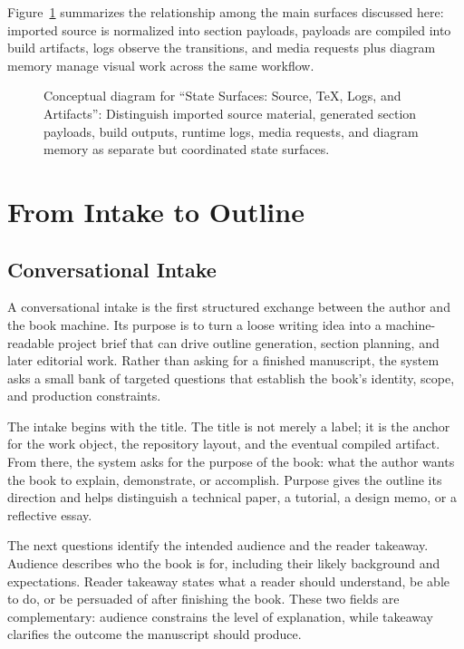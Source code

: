 \documentclass[11pt]{article}
\begin{document}
Figure~\ref{fig:state-surfaces} summarizes the relationship among the main surfaces discussed here: imported source is normalized into section payloads, payloads are compiled into build artifacts, logs observe the transitions, and media requests plus diagram memory manage visual work across the same workflow.

\begin{figure}[htbp]
\centering

\caption{Conceptual diagram for ``State Surfaces: Source, TeX, Logs, and Artifacts'': Distinguish imported source material, generated section payloads, build outputs, runtime logs, media requests, and diagram memory as separate but coordinated state surfaces.}
\label{fig:state-surfaces}
\end{figure}



\section{From Intake to Outline}

\subsection{Conversational Intake}


A conversational intake is the first structured exchange between the author and the book machine. Its purpose is to turn a loose writing idea into a machine-readable project brief that can drive outline generation, section planning, and later editorial work. Rather than asking for a finished manuscript, the system asks a small bank of targeted questions that establish the book's identity, scope, and production constraints.

The intake begins with the title. The title is not merely a label; it is the anchor for the work object, the repository layout, and the eventual compiled artifact. From there, the system asks for the purpose of the book: what the author wants the book to explain, demonstrate, or accomplish. Purpose gives the outline its direction and helps distinguish a technical paper, a tutorial, a design memo, or a reflective essay.

The next questions identify the intended audience and the reader takeaway. Audience describes who the book is for, including their likely background and expectations. Reader takeaway states what a reader should understand, be able to do, or be persuaded of after finishing the book. These two fields are complementary: audience constrains the level of explanation, while takeaway clarifies the outcome the manuscript should produce.
\end{document}
